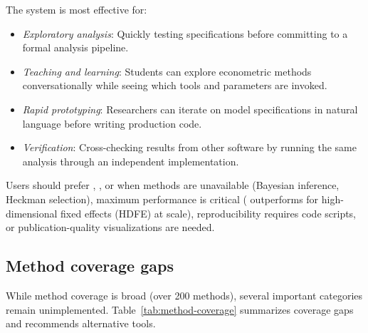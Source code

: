 The system is most effective for:
\begin{itemize}
  \item \emph{Exploratory analysis}: Quickly testing specifications before
    committing to a formal analysis pipeline.
  \item \emph{Teaching and learning}: Students can explore econometric methods
    conversationally while seeing which tools and parameters are invoked.
  \item \emph{Rapid prototyping}: Researchers can iterate on model specifications
    in natural language before writing production code.
  \item \emph{Verification}: Cross-checking results from other software by
    running the same analysis through an independent implementation.
\end{itemize}

\noindent Users should prefer , , or 
when methods are unavailable (Bayesian inference, Heckman selection), maximum
performance is critical ( outperforms for high-dimensional fixed effects (HDFE) at scale),
reproducibility requires code scripts, or publication-quality visualizations
are needed.

\subsection{Method coverage gaps}

While method coverage is broad (over 200 methods), several important categories
remain unimplemented. Table~\ref{tab:method-coverage} summarizes coverage
gaps and recommends alternative tools.

